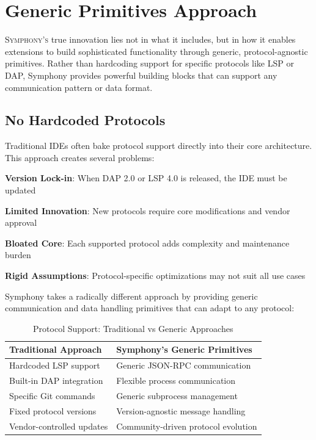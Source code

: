 
\section*{Generic Primitives Approach}

\lettrine{S}{ymphony's} true innovation lies not in what it includes, but in how it enables extensions to build sophisticated functionality through generic, protocol-agnostic primitives. Rather than hardcoding support for specific protocols like LSP or DAP, Symphony provides powerful building blocks that can support any communication pattern or data format.

\subsection*{No Hardcoded Protocols}

Traditional IDEs often bake protocol support directly into their core architecture. This approach creates several problems:

\begin{compactlist}
    \item \textbf{Version Lock-in}: When DAP 2.0 or LSP 4.0 is released, the IDE must be updated
    \item \textbf{Limited Innovation}: New protocols require core modifications and vendor approval
    \item \textbf{Bloated Core}: Each supported protocol adds complexity and maintenance burden
    \item \textbf{Rigid Assumptions}: Protocol-specific optimizations may not suit all use cases
\end{compactlist}

Symphony takes a radically different approach by providing generic communication and data handling primitives that can adapt to any protocol:

\begin{table}[ht]
\centering
\begin{tabular}{@{}p{}p{}@{}}
\toprule
\textbf{Traditional Approach} & \textbf{Symphony's Generic Primitives} \\
\midrule
Hardcoded LSP support & Generic JSON-RPC communication \\
Built-in DAP integration & Flexible process communication \\
Specific Git commands & Generic subprocess management \\
Fixed protocol versions & Version-agnostic message handling \\
Vendor-controlled updates & Community-driven protocol evolution \\
\bottomrule
\end{tabular}
\caption{Protocol Support: Traditional vs Generic Approaches}
\end{table}

